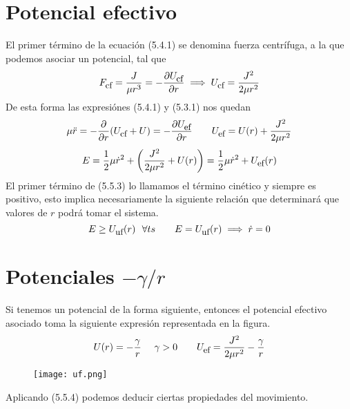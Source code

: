 \section{Potencial efectivo} 
El primer término de la ecuación (5.4.1) se denomina fuerza centrífuga, a la que podemos asociar un potencial, tal que 
\begin{equation} \label{5.1.28}
    F_{\mbox{\small cf}} = \frac{J}{\mu r^3} = -\frac{\partial U_{\mbox{\small cf}}}{\partial r} \implies U_{\mbox{\small cf}} = \frac{J^2}{2\mu r^2}
\end{equation} 
De esta forma las expresiónes (5.4.1) y (5.3.1) nos quedan
\begin{equation} \label{5.1.29}
    \mu \ddot{r} = -\frac{\partial}{\partial r} (U_{\mbox{\small cf}}+U) = -\frac{\partial U_{\mbox{\small ef}}}{\partial r} \ \ \ \ \ \  U_{\mbox{\small ef}} = U(r) + \frac{J^2}{2\mu r^2}
\end{equation} 
\begin{equation} \label{5.1.29}
    E = \frac{1}{2}\mu \dot{r}^2 + \left(\frac{J^2}{2\mu r^2}+U(r)\right) = \frac{1}{2}\mu\dot{r}^2 + U_{\mbox{\small ef}}(r)
\end{equation} 
El primer término de (5.5.3) lo llamamos el término cinético y siempre es positivo, esto implica necesariamente la siguiente relación que determinará que valores de $r$ podrá tomar el sistema.
\begin{equation} \label{5.1.30}
    E\geq U_{\mbox{\small uf}}(r) \ \ \forall ts \ \ \ \ \ \ E = U_{\mbox{\small uf}}(r) \implies \dot{r}=0
\end{equation} 


\clearpage
\section{Potenciales $-\gamma/r$}
Si tenemos un potencial de la forma siguiente, entonces el potencial efectivo asociado toma la siguiente expresión representada en la figura.
\begin{equation} \label{5.6.1}
    U(r) = -\frac{\gamma}{r} \ \ \ \ \gamma>0 \ \ \ \ \ \ U_{\mbox{\small ef}} =  \frac{J^2}{2\mu r^2} -\frac{\gamma}{r}
\end{equation} 
\begin{figure}[h]
    \texttt{[image: uf.png]}
\end{figure}
Aplicando (5.5.4) podemos deducir ciertas propiedades del movimiento.

